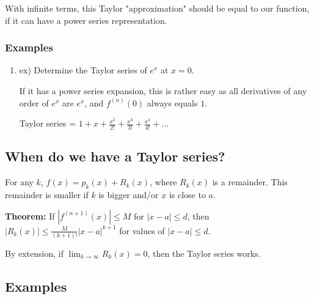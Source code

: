 \documentclass{article}
\begin{document}
With infinite terms, this Taylor "approximation" should be equal to our function, if it can have a power series representation. 

\subsubsection{Examples}

\begin{enumerate}
    \item ex) Determine the Taylor series of $e^x$ at $x=0$.
    
    If it has a power series expansion, this is rather easy as all derivatives of any order of $e^x$ are $e^x$, and $f^{(n)}(0)$ always equals $1$.
    
    Taylor series = $1+x+\frac{x^2}{2!} +\frac{x^3}{3!} + \frac{x^4}{4!} + ...$

\end{enumerate}

\subsection{When do we have a Taylor series?}

For any $k$, $f(x) = p_k(x) + R_k(x)$, where $R_k(x)$  is a remainder. This remainder is smaller if $k$ is bigger and/or $x$ is close to $a$.

\textbf{Theorem:} If $|f^{(n+1)}(x)| \leq M$ for $|x-a| \leq d$, then $|R_k(x)| \leq \frac{M}{(k+1)!}|x-a|^{k+1}$ for values of $|x-a| \leq d$.

By extension, if $\lim_{k\to\infty} R_k(x) = 0$, then the Taylor series works.

\subsection{Examples}
\end{document}
